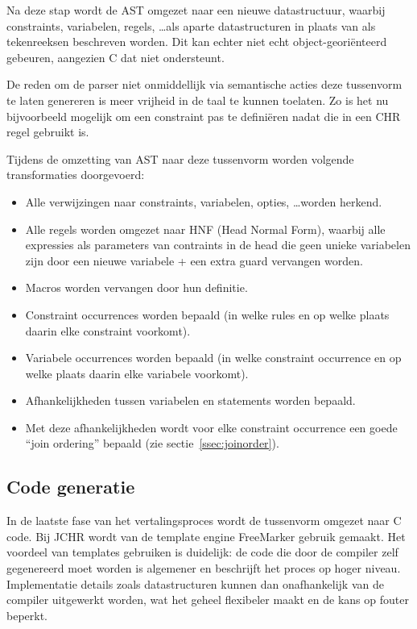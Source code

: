 Na deze stap wordt de AST omgezet naar een nieuwe datastructuur, waarbij constraints, variabelen, regels, \ldots als aparte datastructuren in plaats van als tekenreeksen beschreven worden. Dit kan echter niet echt object-geori\"enteerd gebeuren, aangezien C dat niet ondersteunt.

De reden om de parser niet onmiddellijk via semantische acties deze tussenvorm te laten genereren is meer vrijheid in de taal te kunnen toelaten. Zo is het nu bijvoorbeeld mogelijk om een constraint pas te defini\"eren nadat die in een CHR regel gebruikt is.

Tijdens de omzetting van AST naar deze tussenvorm worden volgende transformaties doorgevoerd: \begin{itemize}
\item Alle verwijzingen naar constraints, variabelen, opties, \ldots worden herkend.
\item Alle regels worden omgezet naar HNF (Head Normal Form), waarbij alle expressies als parameters van contraints in de head die geen unieke variabelen zijn door een nieuwe variabele + een extra guard vervangen worden.
\item Macros worden vervangen door hun definitie.
\item Constraint occurrences worden bepaald (in welke rules en op welke plaats daarin elke constraint voorkomt).
\item Variabele occurrences worden bepaald (in welke constraint occurrence en op welke plaats daarin elke variabele voorkomt).
\item Afhankelijkheden tussen variabelen en statements worden bepaald.
\item Met deze afhankelijkheden wordt voor elke constraint occurrence een goede ``join ordering'' bepaald (zie sectie~\ref{ssec:joinorder}).
\end{itemize}

\subsection{Code generatie}

In de laatste fase van het vertalingsproces wordt de tussenvorm omgezet naar C code. Bij JCHR wordt van de template engine FreeMarker gebruik gemaakt. Het voordeel van templates gebruiken is duidelijk: de code die door de compiler zelf gegenereerd moet worden is algemener en beschrijft het proces op hoger niveau. Implementatie details zoals datastructuren kunnen dan onafhankelijk van de compiler uitgewerkt worden, wat het geheel flexibeler maakt en de kans op fouter beperkt.

